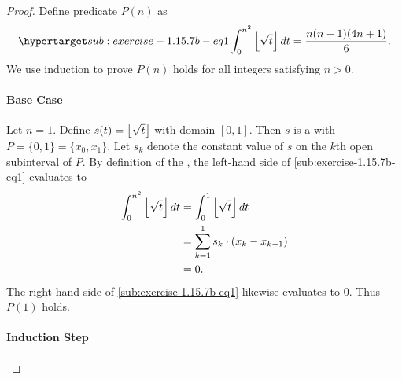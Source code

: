 \documentclass{report}
\begin{document}
  \begin{proof}

    Define predicate $P(n)$ as
      \begin{equation}
        \hyperlabel{sub:exercise-1.15.7b-eq1}
        \int_0^{n^2} \floor{\sqrt{t}} \mathop{dt} = \frac{n(n - 1)(4n + 1)}{6}.
      \end{equation}
    We use induction to prove $P(n)$ holds for all integers satisfying $n > 0$.

    \paragraph{Base Case}%

      Let $n = 1$.
      Define $s(t) = \left\lfloor\sqrt{t}\right\rfloor$ with domain $[0, 1]$.
      Then $s$ is a  with 
        $P = \{0, 1\} = \{x_0, x_1\}$.
      Let $s_k$ denote the constant value of $s$ on the $k$th open subinterval
        of $P$.
      By definition of the , the left-hand
        side of \eqref{sub:exercise-1.15.7b-eq1} evaluates to
        \begin{align*}
          \int_0^{n^2} \left\lfloor\sqrt{t}\right\rfloor \mathop{dt}
            & = \int_0^1 \left\lfloor\sqrt{t}\right\rfloor \mathop{dt} \\
            & = \sum_{k=1}^1 s_k \cdot (x_k - x_{k-1}) \\
            & = 0.
        \end{align*}
      The right-hand side of \eqref{sub:exercise-1.15.7b-eq1} likewise evaluates
        to $0$.
      Thus $P(1)$ holds.

    \paragraph{Induction Step}%


\end{proof}
\end{document}
